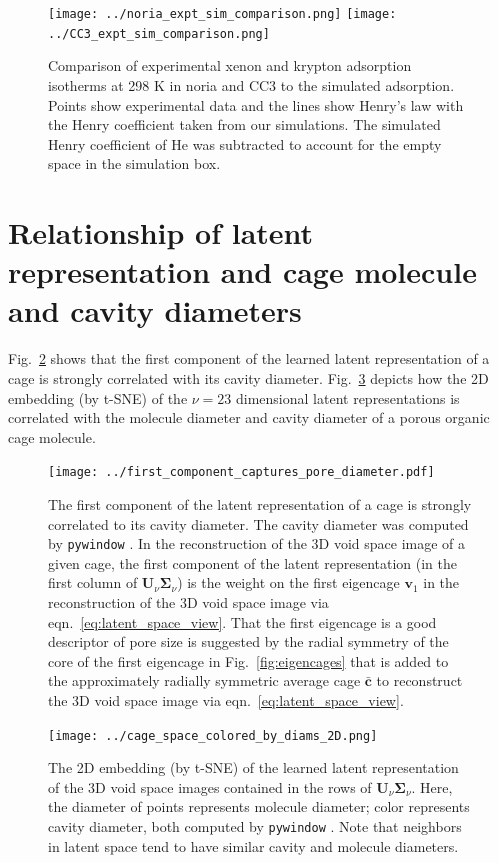 \documentclass[journal=jacsat,manuscript=article]{achemso}
\begin{document}
\begin{figure}
\centering
	\texttt{[image: ../noria\_expt\_sim\_comparison.png]}
	\texttt{[image: ../CC3\_expt\_sim\_comparison.png]}
	\caption{Comparison of experimental xenon and krypton adsorption isotherms at 298 K in noria \cite{patil2016noria} and CC3 \cite{chen2014separation} to the simulated adsorption. Points show experimental data and the lines show Henry's law with the Henry coefficient taken from our simulations. The simulated Henry coefficient of He was subtracted to account for the empty space in the simulation box.
	} \label{fig:expt_sim_compare}
\end{figure}

\newpage
\clearpage

\section{Relationship of latent representation and cage molecule and cavity diameters}
Fig.~\ref{fig:first_component_captures_pore_diameter} shows that the first component of the learned latent representation of a cage is strongly correlated with its cavity diameter. 
Fig.~\ref{fig:cage_space_colored_by_diams_2D} depicts how the 2D embedding (by t-SNE) of the $\nu=23$ dimensional latent representations is correlated with the molecule diameter and cavity diameter of a porous organic cage molecule.

\begin{figure}
\centering
	\texttt{[image: ../first\_component\_captures\_pore\_diameter.pdf]}
	\caption{The first component of the latent representation of a cage is strongly correlated to its cavity diameter. The cavity diameter was computed by \texttt{pywindow} \cite{miklitz2018pywindow}. In the reconstruction of the 3D void space image of a given cage, the first component of the latent representation (in the first column of $\mathbf{U}_\nu \mathbf{\Sigma}_\nu$) is the weight on the first eigencage $\mathbf{v}_1$ in the reconstruction of the 3D void space image via eqn.~\ref{eq:latent_space_view}. That the first eigencage is a good descriptor of pore size is suggested by the radial symmetry of the core of the first eigencage in Fig.~\ref{fig:eigencages} that is added to the approximately radially symmetric average cage $\bar{\mathbf{c}}$ to reconstruct the 3D void space image via eqn.~\ref{eq:latent_space_view}.
	} \label{fig:first_component_captures_pore_diameter}
\end{figure}


\begin{figure}
\centering
	\texttt{[image: ../cage\_space\_colored\_by\_diams\_2D.png]}
	\caption{The 2D embedding (by t-SNE) of the learned latent representation of the 3D void space images contained in the rows of $\mathbf{U}_\nu \mathbf{\Sigma}_\nu$. Here, the diameter of points represents molecule diameter; color represents cavity diameter, both computed by \texttt{pywindow} \cite{miklitz2018pywindow}. Note that neighbors in latent space tend to have similar cavity and molecule diameters.
	} \label{fig:cage_space_colored_by_diams_2D}
\end{figure}
\end{document}
